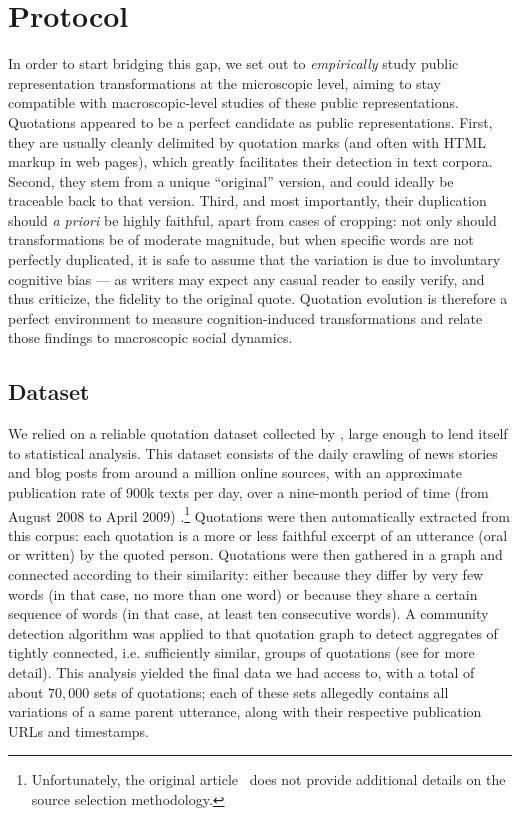 \section{Protocol} %
\label{sec:protocol}

In order to start bridging this gap, we set out to \emph{empirically} study public representation transformations at the microscopic level, aiming to stay compatible with macroscopic-level studies of these public representations.
Quotations appeared to be a perfect candidate as public representations.
First, they are usually cleanly delimited by quotation marks (and often with HTML markup in web pages), which greatly facilitates their detection in text corpora.
Second, they stem from a unique ``original'' version, and could ideally be traceable back to that version.
Third, and most importantly, their duplication should \emph{a priori} be highly faithful, apart from cases of cropping: not only should transformations be of moderate magnitude, but when specific words are not perfectly duplicated, it is safe to assume that the variation is due to involuntary cognitive bias --- as writers may expect any casual reader to easily verify, and thus criticize, the fidelity to the original quote.
Quotation evolution is therefore a perfect environment to measure cognition-induced transformations and relate those findings to macroscopic social dynamics.

\subsection{Dataset}

We relied on a reliable quotation dataset collected by \citet{Leskovec09}, large enough to lend itself to statistical analysis.
This dataset consists of the daily crawling of news stories and blog posts from around a million online sources, with an approximate publication rate of 900k texts per day, over a nine-month period of time (from August 2008 to April 2009) \cite{Leskovec09-url}.\footnote{Unfortunately, the original article~\citep{Leskovec09} does not provide additional details on the source selection methodology.}
Quotations were then automatically extracted from this corpus: each quotation is a more or less faithful excerpt of an utterance (oral or written) by the quoted person.
Quotations were then gathered in a graph and connected according to their similarity: either because they differ by very few words (in that case, no more than one word) or because they share a certain sequence of words (in that case, at least ten consecutive words).
A community detection algorithm was applied to that quotation graph to detect aggregates of tightly connected, i.e. sufficiently similar, groups of quotations (see \citet{Leskovec09} for more detail).
This analysis yielded the final data we had access to, with a total of about $70,000$ sets of quotations; each of these sets allegedly contains all variations of a same parent utterance, along with their respective publication URLs and timestamps.


